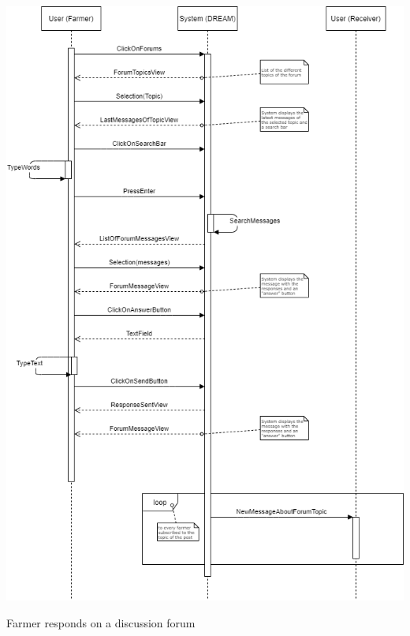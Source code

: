 \documentclass{article}
\begin{document}
\begin{center}
    \newpage
    
    \includegraphics[width=1.0\textwidth]{images/sequenceDiagrams/9. FarmerRespondDiscForum.png} 
    \par
    \caption{\label{fig:frog}Farmer responds on a discussion forum}
    
    \newpage
    
    
    
    
    
    
    

\end{center}
\end{document}
